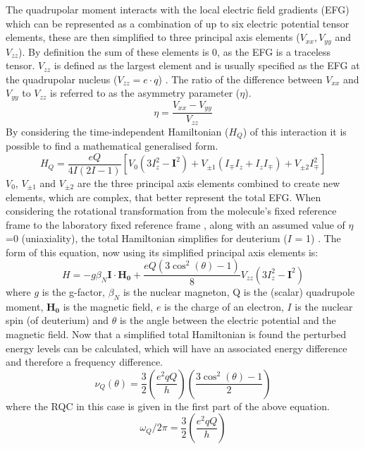 \documentclass[class=article, crop=false]{standalone}
\begin{document}
The quadrupolar moment interacts with the local electric field gradients (EFG) which can be represented as a combination of up to six electric potential tensor elements, these are then simplified to three principal axis elements ($V_{xx}, V_{yy}$ and $V_{zz}$). By definition the sum of these elements is 0, as the EFG is a traceless tensor. $V_{zz}$ is defined as the largest element and is usually specified as the EFG at the quadrupolar nucleus ($V_{zz} = e\cdot q$) \cite{Elliott2021WhatMedia}. The ratio of the difference between $V_{xx}$ and $V_{yy}$ to $V_{zz}$ is referred to as the asymmetry parameter ($\eta$).
\begin{equation}
    \eta = \frac{V_{xx}-V_{yy}}{V_{zz}}
\end{equation}
By considering the time-independent Hamiltonian ($H_Q$) of this interaction it is possible to find a mathematical generalised form.
\begin{equation}
    H_Q = \frac{eQ}{4I(2I-1)}[V_0(3I^2_z-\boldsymbol{I}^2) + V_{\pm1}(I_{\mp}I_z+I_zI_\mp)+V_{\pm2}I^2_\mp]
\end{equation}
$V_0$, $V_{\pm1}$ and $V_{\pm2}$ are the three principal axis elements combined to create new elements, which are complex, that better represent the total EFG. When considering the rotational transformation from the molecule's fixed reference frame to the laboratory fixed reference frame \cite{Seelig1977DeuteriumMembranes}, along with an assumed value of $\eta$=0 (uniaxiality), the total Hamiltonian simplifies for deuterium ($I$ = 1)  \cite{Sharf1995DetectionNMR-Spectroscopy}. The form of this equation, now using its simplified principal axis elements is:
\begin{equation}
    H = -g\beta_N\boldsymbol{I}\cdot\boldsymbol{H_0} + \frac{eQ(3\cos^2(\theta)-1)}{8}V_{zz}(3I_z^2-\boldsymbol{I}^2)
\end{equation}
where $g$ is the g-factor, $\beta_N$ is the nuclear magneton, Q is the (scalar) quadrupole moment, $\boldsymbol{H_0}$ is the magnetic field, $e$ is the charge of an electron, $I$ is the nuclear spin (of deuterium) and $\theta$ is the angle between the electric potential and the magnetic field. Now that a simplified total Hamiltonian is found the perturbed energy levels can be calculated, which will have an associated energy difference and therefore a frequency difference.
\begin{equation}
    \nu_Q(\theta) = \frac{3}{2}\left(\frac{e^2qQ}{h}\right)\left(\frac{3\cos^2(\theta)-1}{2}\right)
    \label{eqn:Quad:Angle}
\end{equation}
where the RQC in this case is given in the first part of the above equation.
\begin{equation}
    \omega_Q/2\pi = \frac{3}{2}\left(\frac{e^2qQ}{h}\right)
    \label{eqn:Quad:RQC}
\end{equation}
\end{document}
